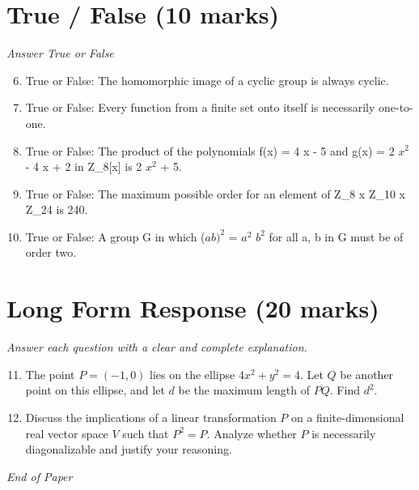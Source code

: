\documentclass[12pt]{article}
\begin{document}
\section*{True / False (10 marks)}
\textit{Answer True or False}
\begin{enumerate}[label=\arabic*.]
\setcounter{enumi}{5}
\item True or False: The homomorphic image of a cyclic group is always cyclic.
\item True or False: Every function from a finite set onto itself is necessarily one-to-one.
\item True or False: The product of the polynomials f(x) = 4 x - 5 and g(x) = 2 $x^2$ - 4 x + 2 in Z\_8[x] is 2 $x^2$ + 5.
\item True or False: The maximum possible order for an element of Z\_8 x Z\_10 x Z\_24 is 240.
\item True or False: A group G in which ($ab)^2$ = $a^2$ $b^2$ for all a, b in G must be of order two.
\end{enumerate}

\section*{Long Form Response (20 marks)}
\textit{Answer each question with a clear and complete explanation.}
\begin{enumerate}[label=\arabic*.]
\setcounter{enumi}{10}
\item The point $P = (-1,0)$ lies on the ellipse $4 x^2 + y^2 = 4.$ Let $Q$ be another point on this ellipse, and let $d$ be the maximum length of $\overline{PQ}.$ Find $d^2.$
\item Discuss the implications of a linear transformation \( P \) on a finite-dimensional real vector space \( V \) such that \( P^2 = P \). Analyze whether \( P \) is necessarily diagonalizable and justify your reasoning.
\end{enumerate}

\vfill
\noindent\textit{End of Paper}
\end{document}
